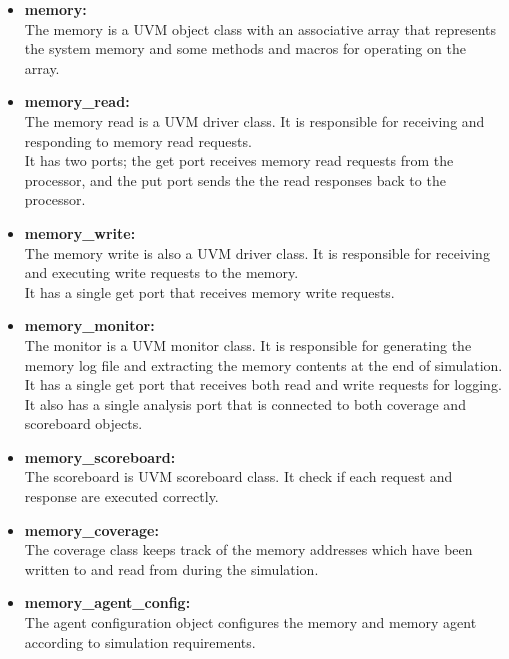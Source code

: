 \documentclass[../main.tex]{subfiles}
\begin{document}
\begin{itemize}
\item 	\textbf{memory:}\\
The memory is a UVM object class with an associative array that represents the system memory and some methods and macros for operating on the array.
\item 	\textbf{memory\_read:}\\
The memory read is a UVM driver class. It is responsible for receiving and responding to memory read requests.\\
It has two ports; the get port receives memory read requests from the processor, and the put port sends the the read responses back to the processor.
\item 	\textbf{memory\_write:}\\
The memory write is also a UVM driver class. It is responsible for receiving and executing write requests to the memory.\\
It has a single get port that receives memory write requests.
\item 	\textbf{memory\_monitor:}\\
The monitor is a UVM monitor class. It is responsible for generating the memory log file and extracting the memory contents at the end of simulation.\\
It has a single get port that receives both read and write requests for logging.
It also has a single analysis port that is connected to both coverage and scoreboard objects.
\item 	\textbf{memory\_scoreboard:}\\
The scoreboard is UVM scoreboard class. It check if each request and response are executed correctly.
\item 	\textbf{memory\_coverage:}\\
The coverage class keeps track of the memory addresses which have been written to and read from during the simulation.
\item 	\textbf{memory\_agent\_config:}\\
The agent configuration object configures the memory and memory agent according to simulation requirements.
\end{itemize}
\end{document}
